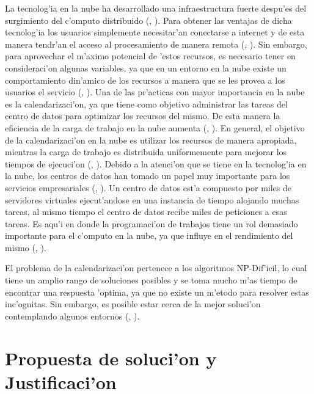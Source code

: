 La tecnolog'ia en la nube ha desarrollado una infraestructura fuerte despu'es del surgimiento del c'omputo distribuido (\citeauthor{chen2009cloud}, \citeyear{chen2009cloud}). Para obtener las ventajas de dicha tecnolog'ia los usuarios simplemente necesitar'an conectarse a internet y de esta manera tendr'an el acceso al procesamiento de manera remota (\citeauthor{aranganathan2011aco}, \citeyear{aranganathan2011aco}). Sin embargo, para aprovechar el m'aximo potencial de 'estos recursos, es necesario tener en consideraci'on algunas variables, ya que en un entorno en la nube existe un comportamiento din'amico de los recursos a manera que se les provea a los usuarios el servicio (\citeauthor{shimpy2014different}, \citeyear{shimpy2014different}).
Una de las pr'acticas con mayor importancia en la nube es la calendarizaci'on, ya que tiene como objetivo administrar las tareas del centro de datos para optimizar los recursos del mismo. De esta manera la eficiencia de la carga de trabajo en la nube aumenta (\citeauthor{shimpy2014different}, \citeyear{shimpy2014different}).
En general, el objetivo de la calendarizaci'on en la nube es utilizar los recursos de manera apropiada, mientras la carga de trabajo es distribuida uniformemente para mejorar los tiempos de ejecuci'on (\citeauthor{shimpy2014different}, \citeyear{shimpy2014different}).
Debido a la atenci'on que se tiene en la tecnolog'ia en la nube, los centros de datos han tomado un papel muy importante para los servicios empresariales (\citeauthor{shimpy2014different}, \citeyear{shimpy2014different}). 
Un centro de datos est'a compuesto por miles de servidores virtuales ejecut'andose en una instancia de tiempo alojando muchas tareas, al mismo tiempo el centro de datos recibe miles de peticiones a esas tareas. Es aqu'i en donde la programaci'on de trabajos tiene un rol demasiado importante para el c'omputo en la nube, ya que influye en el rendimiento del mismo (\citeauthor{srinivasan2014cloud}, \citeyear{srinivasan2014cloud}). 

El problema de la calendarizaci'on pertenece a los algoritmos NP-Dif'icil, lo cual tiene un amplio rango de soluciones posibles y se toma mucho m'as tiempo de encontrar una respuesta 'optima, ya que no existe un m'etodo para resolver estas inc'ognitas. Sin embargo, es posible estar cerca de la mejor soluci'on contemplando algunos entornos (\citeauthor{shimpy2014different}, \citeyear{shimpy2014different}).




\section*{Propuesta de soluci'on y Justificaci'on}


